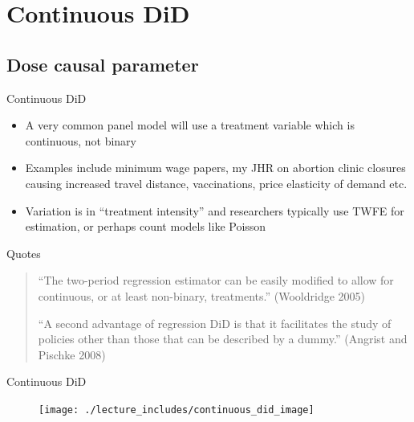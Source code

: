 \documentclass{beamer}
\begin{document}




\section{Continuous DiD}

\subsection{Dose causal parameter}

\begin{frame}{Continuous DiD}

\begin{itemize}
\item A very common panel model will use a treatment variable which is continuous, not binary
\item Examples include minimum wage papers, my JHR on abortion clinic closures causing increased travel distance, vaccinations, price elasticity of demand etc.
\item Variation is in ``treatment intensity'' and researchers typically use TWFE for estimation, or perhaps count models like Poisson

\end{itemize}

\end{frame}


\begin{frame}{Quotes}

\begin{quote}
``The two-period regression estimator can be easily modified to allow for continuous, or at least non-binary, treatments.'' (Wooldridge 2005)

\bigskip

``A second advantage of regression DiD is that it facilitates the study of policies other than those that can be described by a dummy.'' (Angrist and Pischke 2008)

\end{quote}

\end{frame}

\clearpage

\begin{frame}{Continuous DiD}

\begin{figure}
\begin{center}
             \texttt{[image: ./lecture\_includes/continuous\_did\_image]}
\end{center}
\end{figure}

\end{frame}
\end{document}
